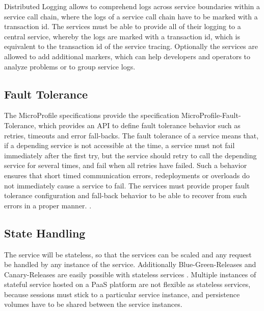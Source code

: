 Distributed Logging allows to comprehend logs across service boundaries within a service call chain, where the logs of a service call chain have to be marked with a transaction id. The services must be able to provide all of their logging to a central service, whereby the logs are marked with a transaction id, which is equivalent to the transaction id of the service tracing. Optionally the services are allowed to add additional markers, which can help developers and operators to analyze problems or to group service logs.

\subsection{Fault Tolerance}
\label{sec:esboc-requirements-service-fault}
The MicroProfile specifications provide the specification MicroProfile-Fault-Tolerance, which provides an API to define fault tolerance behavior such as retries, timeouts and error fall-backs. The fault tolerance of a service means that, if a depending service is not accessible at the time, a service must not fail immediately after the first try, but the service should retry to call the depending service for several times, and fail when all retries have failed. Such a behavior ensures that short timed communication errors, redeployments or overloads do not immediately cause a service to fail. The services must provide proper fault tolerance configuration and fall-back behavior to be able to recover from such errors in a proper manner. \cite{EclipseMicroprofileFault2018}.   

\subsection{State Handling}
\label{sec:esboc-requirements-service-state}
The service will be stateless, so that the services can be scaled and any request be handled by any instance of the service. Additionally Blue-Green-Releases and Canary-Releases are easily possible with stateless services \cite{FowlerBlueGreenRelease2010, FowlerCanaryRelease2010}. Multiple instances of stateful service hosted on a PaaS platform are not flexible as stateless services, because sessions must stick to a particular service instance, and persistence volumes have to be shared between the service instances.  

